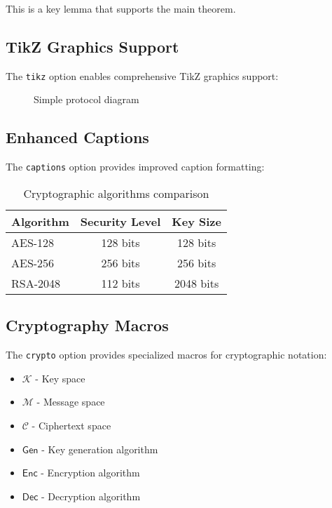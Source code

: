 \documentclass{llncs}
\begin{document}
\begin{lemma}\label{lem:key}
    This is a key lemma that supports the main theorem.
\end{lemma}

\subsection{TikZ Graphics Support}

The \texttt{tikz} option enables comprehensive TikZ graphics support:

\begin{figure}[h]
    \centering
    \caption{Simple protocol diagram}
    \label{fig:protocol}
\end{figure}

\subsection{Enhanced Captions}

The \texttt{captions} option provides improved caption formatting:

\begin{table}[h]
    \centering
    \begin{tabular}{lcc}
        \toprule
        Algorithm & Security Level & Key Size  \\
        \midrule
        AES-128   & 128 bits       & 128 bits  \\
        AES-256   & 256 bits       & 256 bits  \\
        RSA-2048  & 112 bits       & 2048 bits \\
        \bottomrule
    \end{tabular}
    \caption{Cryptographic algorithms comparison}
    \label{tab:algorithms}
\end{table}

\subsection{Cryptography Macros}

The \texttt{crypto} option provides specialized macros for cryptographic
notation:

\begin{itemize}
    \item $\mathcal{K}$ - Key space
    \item $\mathcal{M}$ - Message space
    \item $\mathcal{C}$ - Ciphertext space
    \item $\mathsf{Gen}$ - Key generation algorithm
    \item $\mathsf{Enc}$ - Encryption algorithm
    \item $\mathsf{Dec}$ - Decryption algorithm
\end{itemize}
\end{document}
